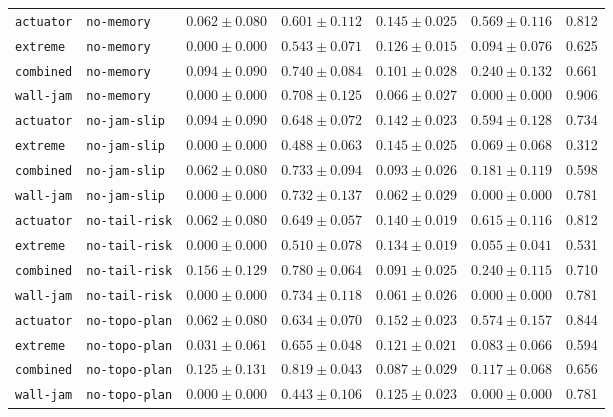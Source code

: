 \documentclass{article}
\begin{document}
\begin{center}
\begin{tabular}{llccccc}
\texttt{actuator} & \texttt{no-memory} & $0.062 \pm 0.080$ & $0.601 \pm 0.112$ & $0.145 \pm 0.025$ & $0.569 \pm 0.116$ & 0.812 \\
\texttt{extreme} & \texttt{no-memory} & $0.000 \pm 0.000$ & $0.543 \pm 0.071$ & $0.126 \pm 0.015$ & $0.094 \pm 0.076$ & 0.625 \\
\texttt{combined} & \texttt{no-memory} & $0.094 \pm 0.090$ & $0.740 \pm 0.084$ & $0.101 \pm 0.028$ & $0.240 \pm 0.132$ & 0.661 \\
\texttt{wall-jam} & \texttt{no-memory} & $0.000 \pm 0.000$ & $0.708 \pm 0.125$ & $0.066 \pm 0.027$ & $0.000 \pm 0.000$ & 0.906 \\
\texttt{actuator} & \texttt{no-jam-slip} & $0.094 \pm 0.090$ & $0.648 \pm 0.072$ & $0.142 \pm 0.023$ & $0.594 \pm 0.128$ & 0.734 \\
\texttt{extreme} & \texttt{no-jam-slip} & $0.000 \pm 0.000$ & $0.488 \pm 0.063$ & $0.145 \pm 0.025$ & $0.069 \pm 0.068$ & 0.312 \\
\texttt{combined} & \texttt{no-jam-slip} & $0.062 \pm 0.080$ & $0.733 \pm 0.094$ & $0.093 \pm 0.026$ & $0.181 \pm 0.119$ & 0.598 \\
\texttt{wall-jam} & \texttt{no-jam-slip} & $0.000 \pm 0.000$ & $0.732 \pm 0.137$ & $0.062 \pm 0.029$ & $0.000 \pm 0.000$ & 0.781 \\
\texttt{actuator} & \texttt{no-tail-risk} & $0.062 \pm 0.080$ & $0.649 \pm 0.057$ & $0.140 \pm 0.019$ & $0.615 \pm 0.116$ & 0.812 \\
\texttt{extreme} & \texttt{no-tail-risk} & $0.000 \pm 0.000$ & $0.510 \pm 0.078$ & $0.134 \pm 0.019$ & $0.055 \pm 0.041$ & 0.531 \\
\texttt{combined} & \texttt{no-tail-risk} & $0.156 \pm 0.129$ & $0.780 \pm 0.064$ & $0.091 \pm 0.025$ & $0.240 \pm 0.115$ & 0.710 \\
\texttt{wall-jam} & \texttt{no-tail-risk} & $0.000 \pm 0.000$ & $0.734 \pm 0.118$ & $0.061 \pm 0.026$ & $0.000 \pm 0.000$ & 0.781 \\
\texttt{actuator} & \texttt{no-topo-plan} & $0.062 \pm 0.080$ & $0.634 \pm 0.070$ & $0.152 \pm 0.023$ & $0.574 \pm 0.157$ & 0.844 \\
\texttt{extreme} & \texttt{no-topo-plan} & $0.031 \pm 0.061$ & $0.655 \pm 0.048$ & $0.121 \pm 0.021$ & $0.083 \pm 0.066$ & 0.594 \\
\texttt{combined} & \texttt{no-topo-plan} & $0.125 \pm 0.131$ & $0.819 \pm 0.043$ & $0.087 \pm 0.029$ & $0.117 \pm 0.068$ & 0.656 \\
\texttt{wall-jam} & \texttt{no-topo-plan} & $0.000 \pm 0.000$ & $0.443 \pm 0.106$ & $0.125 \pm 0.023$ & $0.000 \pm 0.000$ & 0.781 \\

\end{tabular}
\end{center}
\end{document}
